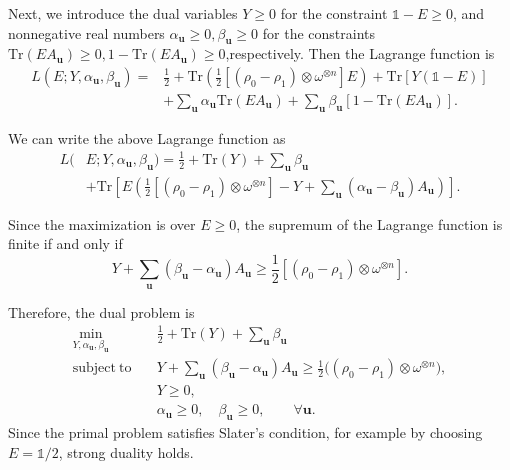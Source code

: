 \documentclass[aps,pra,twocolumn,floatfix,amsfonts,10pt]{revtex4-2}
\begin{document}
Next, we introduce the dual variables $Y\geqslant 0$ for the constraint \(\mathds{1}-E\geqslant 0\), and nonnegative real numbers $\alpha_{\mathbf u}\geqslant 0, \beta_{\mathbf u}\geqslant 0$ for the constraints$ \mathrm{Tr}(EA_{\mathbf u})\geqslant 0, 1-\mathrm{Tr}(EA_{\mathbf u})\geqslant 0$,respectively. 
Then the Lagrange function is
\begin{equation}
	\begin{aligned}
		L(E;Y,\alpha_{\mathbf u},\beta_{\mathbf u}) =&\frac12+\mathrm{Tr}(\frac{1}{2}\left[(\rho_0-\rho_1)\otimes\omega^{\otimes n}\right]E) +\mathrm{Tr}\!\left[Y(\mathds{1}-E)\right] \\ &+\sum_{\mathbf u}\alpha_{\mathbf u} \mathrm{Tr}(EA_{\mathbf u}) +\sum_{\mathbf u}\beta_{\mathbf u} \left[ 1-\mathrm{Tr}(EA_{\mathbf u}) \right].
	\end{aligned}
\end{equation}

We can write the above Lagrange function as
\begin{equation}
	\begin{aligned}
		L(&E;Y,\alpha_{\mathbf u},\beta_{\mathbf u}) = \frac12+\mathrm{Tr}(Y) +\sum_{\mathbf u}\beta_{\mathbf u} \\ &+ \mathrm{Tr}\left[ E\left(\frac{1}{2}\left[(\rho_0-\rho_1)\otimes\omega^{\otimes n}\right]-Y+\sum_{\mathbf u}(\alpha_{\mathbf u}-\beta_{\mathbf u})A_{\mathbf u}\right) \right].
	\end{aligned}
\end{equation}

Since the maximization is over $E\geqslant 0$, the supremum of the
Lagrange function is finite if and only if
\begin{equation}
	Y+\sum_{\mathbf u}
	(\beta_{\mathbf u}-\alpha_{\mathbf u})A_{\mathbf u}
	\geqslant \frac{1}{2}\left[(\rho_0-\rho_1)\otimes\omega^{\otimes n}\right].
\end{equation}

Therefore, the dual problem is
\begin{equation}
	\begin{aligned}
		\min_{Y,\alpha_{\mathbf u},\beta_{\mathbf u}} \quad & \frac12+\mathrm{Tr}(Y) +\sum_{\mathbf u}\beta_{\mathbf u} \\ \mathrm{subject\ to}\quad & Y+\sum_{\mathbf u} (\beta_{\mathbf u}-\alpha_{\mathbf u})A_{\mathbf u} \geqslant \frac12\big((\rho_0-\rho_1)\otimes\omega^{\otimes n}\big),\\ & Y\geqslant 0,\\ & \alpha_{\mathbf u}\geqslant 0,\quad \beta_{\mathbf u}\geqslant 0, \qquad \forall \mathbf u .
	\end{aligned}
\end{equation}
Since the primal problem satisfies Slater's condition, for example by choosing $E = \mathds{1}/2$, strong duality holds.
\end{document}
